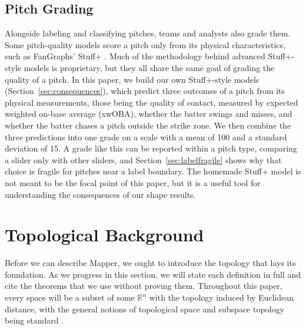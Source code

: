 \documentclass[11pt]{article}
\newcommand{\R}{\mathbb{R}}
\theoremstyle{definition}
\theoremstyle{remark}
\begin{document}
\subsection{Pitch Grading}\label{sec:grading}
Alongside labeling and classifying pitches, teams and analysts also grade them.
Some pitch-quality models score a pitch only from its physical characteristics, such as FanGraphs' Stuff+ \parencite{mcgrattan2023stuffplus}.
Much of the methodology behind advanced Stuff+-style models is proprietary, but they all share the same goal of grading the quality of a pitch.
In this paper, we build our own Stuff+-style models (Section~\ref{sec:consequences}), which predict three outcomes of a pitch from its physical measurements, those being the quality of contact, measured by expected weighted on-base average (xwOBA), whether the batter swings and misses, and whether the batter chases a pitch outside the strike zone.
We then combine the three predictions into one grade on a scale with a mean of 100 and a standard deviation of 15.
A grade like this can be reported within a pitch type, comparing a slider only with other sliders, and Section~\ref{sec:labelfragile} shows why that choice is fragile for pitches near a label boundary.
The homemade Stuff+ model is not meant to be the focal point of this paper, but it is a useful tool for understanding the consequences of our shape results.

\section{Topological Background}\label{sec:topology}
Before we can describe Mapper, we ought to introduce the topology that lays its foundation.
As we progress in this section, we will state each definition in full and cite the theorems that we use without proving them.
Throughout this paper, every space will be a subset of some $\R^n$ with the topology induced by Euclidean distance, with the general notions of topological space and subspace topology being standard \parencite{munkres2000topology}.
\end{document}
